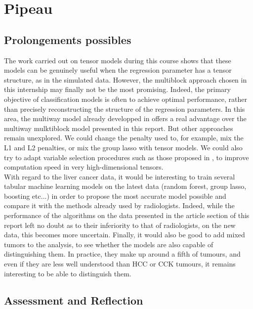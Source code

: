 \documentclass[preprint,12pt]{elsarticle}
\begin{document}
\section{Pipeau}

\subsection{Prolongements possibles}

The work carried out on tensor models during this course shows that these models can be genuinely useful when the regression parameter has a tensor structure, as in the simulated data. However, the multiblock approach chosen in this internship may finally not be the most promising. Indeed, the primary objective of classification models is often to achieve optimal performance, rather than precisely reconstructing the structure of the regression parameters. In this area, the multiway model already developped in \cite{multi_rank_r} offers a real advantage over the multiway mulktiblock model presented in this report. But other approaches remain unexplored. We could change the penalty used to, for example, mix the L1 and L2 penalties, or mix the group lasso with tensor models. We could also try to adapt variable selection procedures such as those proposed in \cite{sis}, to improve computation speed in very high-dimensional tensors.\\
\indent With regard to the liver cancer data, it would be interesting to train several tabular machine learning models on the latest data (random forest, group lasso, boosting etc...) in order to propose the most accurate model possible and compare it with the methods already used by radiologists. Indeed, while the performance of the algorithms on the data presented in the article section of this report left no doubt as to their inferiority to that of radiologists, on the new data, this becomes more uncertain. Finally, it would also be good to add mixed tumors to the analysis, to see whether the models are also capable of distinguishing them. In practice, they make up around a fifth of tumours, and even if they are less well understood than HCC or CCK tumours, it remains interesting to be able to distinguish them.\\

\subsection{Assessment and Reflection}
\end{document}
